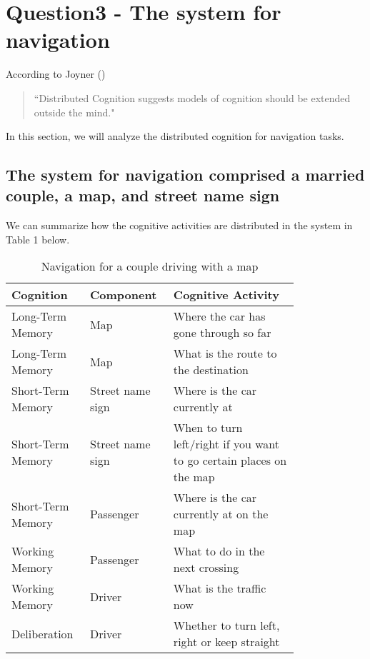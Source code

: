 \documentclass[
	letterpaper, %
]{jdf}
\begin{document}
\section{Question3 - The system for navigation}

According to Joyner (\cite{joyner2016b})
\begin{quotation}
    \noindent “Distributed Cognition suggests models of cognition should be extended outside the mind."
\end{quotation}
In this section, we will analyze the distributed cognition for navigation tasks.

\subsection{The system for navigation comprised a married couple, a map, and street name sign}

We can summarize how the cognitive activities are distributed in the system in Table 1 below.

\begin{table}[h] %
	\caption{Navigation for a couple driving with a map}
	\small %
	\centering %
	\begin{tabular}{L{0.2\linewidth} L{0.2\linewidth} L{0.4\linewidth}}
		\textbf{Cognition} & \textbf{Component} & \textbf{Cognitive Activity}\\
		\toprule[0.5pt]
		Long-Term Memory & Map & Where the car has gone through so far \\
		\midrule
		Long-Term Memory & Map & What is the route to the destination \\
		\midrule
		Short-Term Memory & Street name sign & Where is the car currently at \\
		\midrule
		Short-Term Memory & Street name sign & When to turn left/right if you want to go certain places on the map \\
		\midrule
		Short-Term Memory & Passenger & Where is the car currently at on the map \\
		\midrule
		Working Memory & Passenger & What to do in the next crossing \\
		\midrule
		Working Memory & Driver & What is the traffic now \\
		\midrule
		Deliberation & Driver & Whether to turn left, right or keep straight \\
	\end{tabular}
\end{table}
\end{document}
